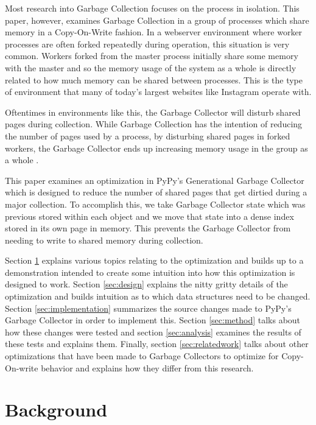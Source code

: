 \documentclass{article}
\begin{document}
Most research into Garbage Collection focuses on the process in isolation.  This paper, however, examines Garbage Collection in a group of processes which share memory in a Copy-On-Write fashion.  In a webserver environment where worker processes are often forked repeatedly during operation, this situation is very common.  Workers forked from the master process initially share some memory with the master and so the memory usage of the system as a whole is directly related to how much memory can be shared between processes.  This is the type of environment that many of today's largest websites like Instagram operate with\cite{dismissing_garbage}.

Oftentimes in environments like this, the Garbage Collector will disturb shared pages during collection.  While Garbage Collection has the intention of reducing the number of pages used by a process, by disturbing shared pages in forked workers, the Garbage Collector ends up increasing memory usage in the group as a whole \cite{dismissing_garbage}.  

This paper examines an optimization in PyPy's Generational Garbage Collector\cite{pypy-doc} which is designed to reduce the number of shared pages that get dirtied during a major collection.  To accomplish this, we take Garbage Collector state which was previous stored within each object and we move that state into a dense index stored in its own page in memory.  This prevents the Garbage Collector from needing to write to shared memory during collection.  

Section \ref{sec:background} explains various topics relating to the optimization and builds up to a demonstration intended to create some intuition into how this optimization is designed to work.  Section \ref{sec:design} explains the nitty gritty details of the optimization and builds intuition as to which data structures need to be changed.  Section \ref{sec:implementation} summarizes the source changes made to PyPy's Garbage Collector in order to implement this.  Section \ref{sec:method} talks about how these changes were tested and section \ref{sec:analysis} examines the results of these tests and explains them.  Finally, section \ref{sec:relatedwork} talks about other optimizations that have been made to Garbage Collectors to optimize for Copy-On-write behavior and explains how they differ from this research.  

\section{Background}\label{sec:background}
\end{document}
